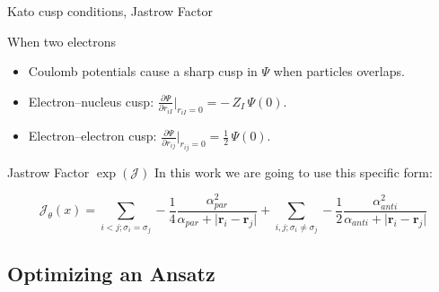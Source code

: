 \documentclass{beamer}
\begin{document}
\begin{frame}{Kato cusp conditions, Jastrow Factor}

When two electrons

\begin{itemize}
        \item Coulomb potentials cause a sharp cusp in $\Psi$ when particles overlaps.
        \item Electron--nucleus cusp: $\displaystyle \frac{\partial \Psi}{\partial r_{iI}}\Big|_{r_{iI}=0} = -\,Z_I\,\Psi(0)$.
        \item Electron--electron cusp: $\displaystyle \frac{\partial \Psi}{\partial r_{ij}}\Big|_{r_{ij}=0} = \frac{1}{2}\,\Psi(0)$.
    \end{itemize}

\begin{block}{Jastrow Factor $\exp(\mathcal{J})$}
In this work we are going to use this specific form:


\begin{equation}
 \mathcal{J}_{\theta}(x)=\sum_{i<j;\sigma_{i}=\sigma_{j}}-\frac{1}{4}\frac{\alpha^{2}_{par}}{\alpha_{par}+\lvert \mathbf{r}_{i}-\mathbf{r}_{j} \rvert }+\sum_{i,j;\sigma_{i}\neq \sigma_{j}}-\frac{1}{2}\frac{\alpha^{2}_{anti}}{\alpha_{anti}+\lvert \mathbf{r}_{i}-\mathbf{r}_{j} \rvert }
\end{equation}

\end{block}
\end{frame}

\subsection{Optimizing an Ansatz}
\end{document}
